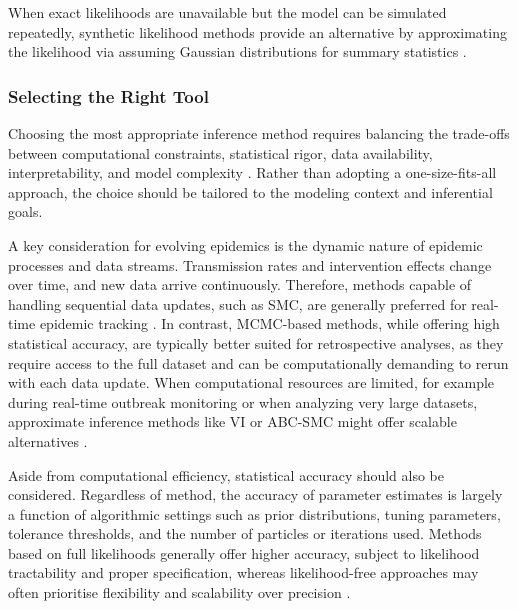\documentclass{article}
\begin{document}
When exact likelihoods are unavailable but the model can be simulated repeatedly, synthetic likelihood methods provide an alternative by approximating the likelihood via assuming Gaussian distributions for summary statistics \citep{wood2010statistical, price2018bayesian}. 

\subsubsection{Selecting the Right Tool}

Choosing the most appropriate inference method requires balancing the trade-offs between computational constraints, statistical rigor, data availability, interpretability, and model complexity \citep{funk2020choices}. Rather than adopting a one-size-fits-all approach, the choice should be tailored to the modeling context and inferential goals. 

A key consideration for evolving epidemics is the dynamic nature of epidemic processes and data streams. Transmission rates and intervention effects change over time, and new data arrive continuously. Therefore, methods capable of handling sequential data updates, such as SMC, are generally preferred for real-time epidemic tracking \cite{birrell2020efficient, storvik2023sequential}. In contrast, MCMC-based methods, while offering high statistical accuracy, are typically better suited for retrospective analyses, as they require access to the full dataset and can be computationally demanding to rerun with each data update. When computational resources are limited, for example during real-time outbreak monitoring or when analyzing very large datasets, approximate inference methods like VI or ABC-SMC might offer scalable alternatives \citep{chatzilena2019contemporary, engebretsen2023real}.

Aside from computational efficiency, statistical accuracy should also be considered. Regardless of method, the accuracy of parameter estimates is largely a function of algorithmic settings such as prior distributions, tuning parameters, tolerance thresholds, and the number of particles or iterations used. Methods based on full likelihoods generally offer higher accuracy, subject to likelihood tractability and proper specification, whereas likelihood-free approaches may often prioritise flexibility and scalability over precision \cite{alahmadi2020comparison}. 
\end{document}
